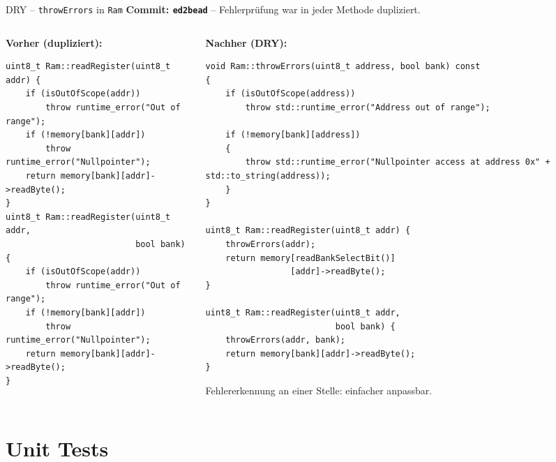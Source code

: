 \documentclass[10pt]{beamer}
\begin{document}
\begin{frame}[fragile]{DRY -- \texttt{throwErrors} in \texttt{Ram}}
    \textbf{Commit: \texttt{ed2bead}} -- Fehlerprüfung war in jeder Methode dupliziert.
    \vspace{0.3em}
    \begin{columns}
        \begin{column}{0.5\textwidth}
            \textbf{Vorher (dupliziert):}
\begin{lstlisting}[language=picassocpp, basicstyle=\ttfamily\tiny]
uint8_t Ram::readRegister(uint8_t addr) {
    if (isOutOfScope(addr))
        throw runtime_error("Out of range");
    if (!memory[bank][addr])
        throw runtime_error("Nullpointer");
    return memory[bank][addr]->readByte();
}
uint8_t Ram::readRegister(uint8_t addr,
                          bool bank) {
    if (isOutOfScope(addr))
        throw runtime_error("Out of range");
    if (!memory[bank][addr])
        throw runtime_error("Nullpointer");
    return memory[bank][addr]->readByte();
}
\end{lstlisting}
        \end{column}
        \begin{column}{0.5\textwidth}
            \textbf{Nachher (DRY):}
\begin{lstlisting}[language=picassocpp, basicstyle=\ttfamily\tiny]
void Ram::throwErrors(uint8_t address, bool bank) const
{
    if (isOutOfScope(address))
        throw std::runtime_error("Address out of range");

    if (!memory[bank][address])
    {
        throw std::runtime_error("Nullpointer access at address 0x" + std::to_string(address));
    }
}

uint8_t Ram::readRegister(uint8_t addr) {
    throwErrors(addr);
    return memory[readBankSelectBit()]
                 [addr]->readByte();
}

uint8_t Ram::readRegister(uint8_t addr,
                          bool bank) {
    throwErrors(addr, bank);
    return memory[bank][addr]->readByte();
}
\end{lstlisting}
            \vspace{0.3em}
            Fehlererkennung an einer Stelle: einfacher anpassbar.
        \end{column}
    \end{columns}
\end{frame}

\section{Unit Tests}
\end{document}

